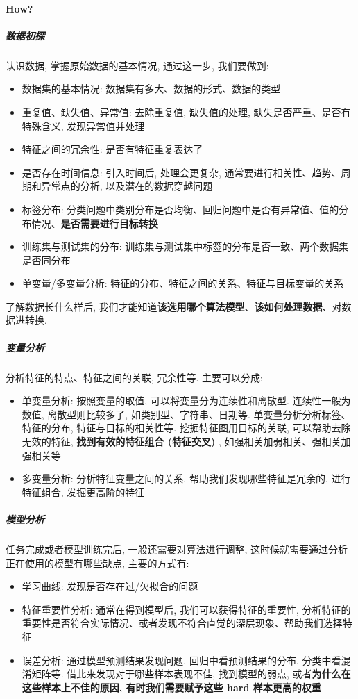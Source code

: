 \paragraph{How?}
\subparagraph{数据初探}认识数据, 掌握原始数据的基本情况, 通过这一步, 我们要做到: 
\begin{itemize}
	\item 数据集的基本情况: 数据集有多大、数据的形式、数据的类型
	\item 重复值、缺失值、异常值: 去除重复值, 缺失值的处理, 缺失是否严重、是否有特殊含义, 发现异常值并处理
	\item 特征之间的冗余性: 是否有特征重复表达了
	\item 是否存在时间信息: 引入时间后, 处理会更复杂, 通常要进行相关性、趋势、周期和异常点的分析, 以及潜在的数据穿越问题
	\item 标签分布: 分类问题中类别分布是否均衡、回归问题中是否有异常值、值的分布情况、\textbf{是否需要进行目标转换}
	\item 训练集与测试集的分布: 训练集与测试集中标签的分布是否一致、两个数据集是否同分布
	\item 单变量/多变量分析: 特征的分布、特征之间的关系、特征与目标变量的关系
\end{itemize}
了解数据长什么样后, 我们才能知道\textbf{该选用哪个算法模型}、\textbf{该如何处理数据}、对数据进转换. 

\subparagraph{变量分析}分析特征的特点、特征之间的关联, 冗余性等. 主要可以分成: 
\begin{itemize}
	\item 单变量分析: 按照变量的取值, 可以将变量分为连续性和离散型. 连续性一般为数值, 离散型则比较多了, 如类别型、字符串、日期等. 单变量分析分析标签、特征的分布, 特征与目标的相关性等. 挖掘特征图用目标的关联, 可以帮助去除无效的特征, \textbf{找到有效的特征组合 (特征交叉) }, 如强相关加弱相关、强相关加强相关等
	\item 多变量分析: 分析特征变量之间的关系. 帮助我们发现哪些特征是冗余的, 进行特征组合, 发掘更高阶的特征
\end{itemize}

\subparagraph{模型分析}任务完成或者模型训练完后, 一般还需要对算法进行调整, 这时候就需要通过分析正在使用的模型有哪些缺点, 主要的方式有: 
\begin{itemize}
	\item 学习曲线: 发现是否存在过/欠拟合的问题
	\item 特征重要性分析: 通常在得到模型后, 我们可以获得特征的重要性, 分析特征的重要性是否符合实际情况、或者发现不符合直觉的深层现象、帮助我们选择特征
	\item 误差分析: 通过模型预测结果发现问题. 回归中看预测结果的分布, 分类中看混淆矩阵等. 借此来发现对于哪些样本表现不佳, 找到模型的弱点, 或者\textbf{为什么在这些样本上不佳的原因, 有时我们需要赋予这些 hard 样本更高的权重}
\end{itemize}





